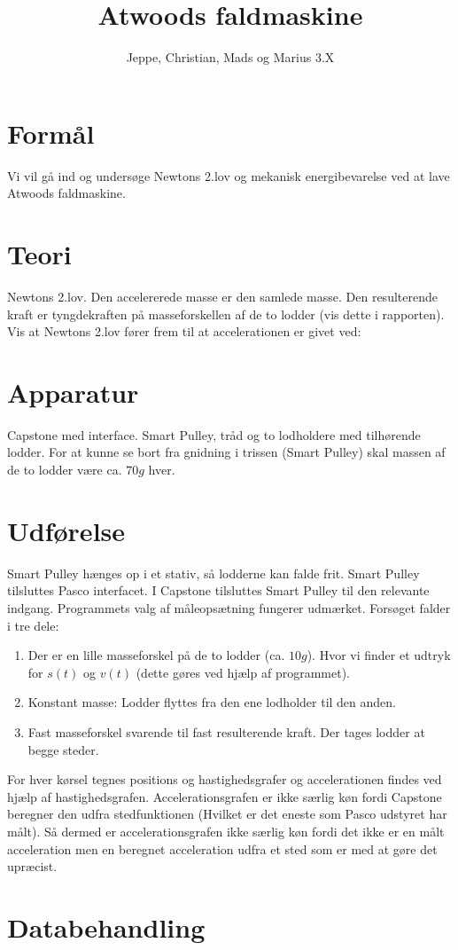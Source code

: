 \documentclass[12 pt]{article}
\title{Atwoods faldmaskine}
\author{Jeppe, Christian, Mads og Marius 3.X}
\date
\begin{document}
\maketitle
\section{Formål}
Vi vil gå ind og undersøge Newtons 2.lov og mekanisk energibevarelse ved at lave Atwoods faldmaskine.
\section{Teori}
Newtons 2.lov. Den accelererede masse er den samlede masse. Den resulterende kraft er tyngdekraften på masseforskellen af de to lodder (vis dette i rapporten).
Vis at Newtons 2.lov fører frem til at accelerationen er givet ved:

\section{Apparatur}
Capstone med interface. Smart Pulley, tråd og to lodholdere med tilhørende lodder. For at kunne se bort fra gnidning i trissen (Smart Pulley)
skal massen af de to lodder være ca. $70 g$ hver.

\section{Udførelse}
Smart Pulley hænges op i et stativ, så lodderne kan falde frit. Smart Pulley tilsluttes Pasco interfacet. I Capstone tilsluttes Smart Pulley til den relevante indgang.
Programmets valg af måleopsætning fungerer udmærket. Forsøget falder i tre dele:
\begin{enumerate}
  \item Der er en lille masseforskel på de to lodder (ca. $10 g$). Hvor vi finder et udtryk for $s(t)$ og $v(t)$ (dette gøres ved hjælp af programmet).
  \item Konstant masse: Lodder flyttes fra den ene lodholder til den anden.
  \item Fast masseforskel svarende til fast resulterende kraft. Der tages lodder at begge steder.
\end{enumerate}
For hver kørsel tegnes positions og hastighedsgrafer og accelerationen findes ved hjælp af hastighedsgrafen.
 Accelerationsgrafen er ikke særlig køn fordi Capstone beregner den udfra stedfunktionen (Hvilket er det eneste som Pasco udstyret har målt).
 Så dermed er accelerationsgrafen ikke særlig køn fordi det ikke er en målt acceleration men en beregnet acceleration udfra et sted som er med at gøre det upræcist.
\section{Databehandling}
\end{document}
